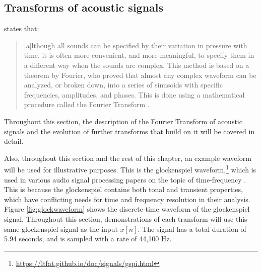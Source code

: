 \documentclass[report.tex]{subfiles}
\begin{document}
\subsection{Transforms of acoustic signals}
\label{sec:freqdomain}

\citeauthor{moore} states that:

\begin{quote}
	[a]lthough all sounds can be specified by their variation in pressure with time, it is often more convenient, and more meaningful, to specify them in a different way when the sounds are complex. This method is based on a theorem by Fourier, who proved that almost any complex waveform can be analyzed, or broken down, into a series of sinusoids with specific frequencies, amplitudes, and phases. This is done using a mathematical procedure called the Fourier Transform \parencite[4]{moore}.
\end{quote}

Throughout this section, the description of the Fourier Transform of acoustic signals and the evolution of further transforms that build on it will be covered in detail.

Also, throughout this section and the rest of this chapter, an example waveform will be used for illustrative purposes. This is the glockenspiel waveform,\footnote{\url{https://ltfat.github.io/doc/signals/gspi.html}} which is used in various audio signal processing papers on the topic of time-frequency \parencite{doerflerphd, balazs, jaillet, tfjigsaw, invertiblecqt, wmdct}. This is because the glockenspiel contains both tonal and transient properties, which have conflicting needs for time and frequency resolution in their analysis. Figure \ref{fig:glockwaveform} shows the discrete-time waveform of the glockenspiel signal. Throughout this section, demonstrations of each transform will use this same glockenspiel signal as the input $x[n]$. The signal has a total duration of 5.94 seconds, and is sampled with a rate of 44,100 Hz.
\end{document}
